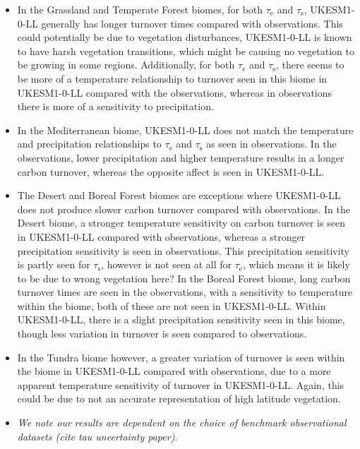 \begin{itemize}
	\item In the Grassland and Temperate Forest biomes, for both $\tau_\mathrm{e}$ and $\tau_\mathrm{s}$, UKESM1-0-LL generally has longer turnover times compared with observations. This could potentially be due to vegetation disturbances, UKESM1-0-LL is known to have harsh vegetation transitions, which might be causing no vegetation to be growing in some regions. Additionally, for both $\tau_\mathrm{e}$ and $\tau_\mathrm{s}$, there seems to be more of a temperature relationship to turnover seen in this biome in UKESM1-0-LL compared with the observations, whereas in observations there is more of a sensitivity to precipitation.
	
	\item In the Mediterranean biome, UKESM1-0-LL does not match the temperature and precipitation relationships to $\tau_\mathrm{e}$ and $\tau_\mathrm{s}$ as seen in observations. In the observations, lower precipitation and higher temperature results in a longer carbon turnover, whereas the opposite affect is seen in UKESM1-0-LL.
	
	\item The Desert and Boreal Forest biomes are exceptions where UKESM1-0-LL does not produce slower carbon turnover compared with observations. In the Desert biome, a stronger temperature sensitivity on carbon turnover is seen in UKESM1-0-LL compared with observations, whereas a stronger precipitation sensitivity is seen in observations. This precipitation sensitivity is partly seen for $\tau_\mathrm{s}$, however is not seen at all for $\tau_\mathrm{e}$, which means it is likely to be due to wrong vegetation here? In the Boreal Forest biome, long carbon turnover times are seen in the observations, with a sensitivity to temperature within the biome, both of these are not seen in UKESM1-0-LL. Within UKESM1-0-LL, there is a slight precipitation sensitivity seen in this biome, though less variation in turnover is seen compared to observations.

	\item In the Tundra biome however, a greater variation of turnover is seen within the biome in UKESM1-0-LL compared with observations, due to a more apparent temperature sensitivity of turnover in UKESM1-0-LL. Again, this could be due to not an accurate representation of high latitude vegetation.
	
	\item \textit{We note our results are dependent on the choice of benchmark observational datasets (cite tau uncertainty paper).}

\end{itemize}



